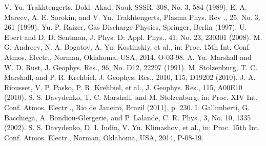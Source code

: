 \documentclass[a4paper, 12pt, onecolumn,singlespacing]{article}
\begin{document}
\begin{thebibliography}{99}
\bibitem{} V. Yu. Trakhtengerts, Dokl. Akad. Nauk SSSR, 308, No. 3, 584 (1989).
\bibitem{} E. A. Mareev, A. E. Sorokin, and V. Yu. Trakhtengerts, Plasma Phys. Rev ., 25, No. 3, 261 (1999).
\bibitem{} Yu. P. Raizer, Gas Discharge Physics, Springer, Berlin (1997).
\bibitem{} U. Ebert and D. D. Sentman, J. Phys. D: Appl. Phys., 41, No. 23, 230301 (2008).
\bibitem{} M. G. Andreev, N. A. Bogatov, A. Yu. Kostinskiy, et al., in: Proc. 15th Int. Conf. Atmos. Electr., Norman, Oklahoma, USA, 2014, O-03-98.
\bibitem{} A. Yu. Marshall and W. D. Rust, J. Geophys. Res., 96, No. D12, 22297 (1991).
\bibitem{} M. Stolzenburg, T. C. Marshall, and P. R. Krehbiel, J. Geophys. Res., 2010, 115, D19202 (2010).
\bibitem{} J. A. Riousset, V. P. Pasko, P. R. Krehbiel, et al., J. Geophys. Res., 115, A00E10 (2010).
\bibitem{} S. S. Davydenko, T. C. Marshall, and M. Stolzenburg, in: Proc. XIV Int. Conf. Atmos. Electr ., Rio de
Janeiro, Brazil (2011), p. 230.
\bibitem{} I. Gallimberti, G. Bacchiega, A. Bondiou-Glergerie, and P. Lalande, C. R. Phys., 3, No. 10, 1335 (2002).
\bibitem{} S. S. Davydenko, D. I. Iudin, V. Yu. Klimashov, et al., in: Proc. 15th Int. Conf. Atmos. Electr., Norman, Oklahoma, USA, 2014, P-08-19.
	\end{thebibliography}
	
\end{document}
